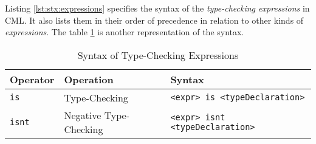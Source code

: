 Listing \ref{lst:stx:expressions} specifies the syntax of
the \emph{type-checking expressions} in CML.
It also lists them in their order of precedence
in relation to other kinds of \emph{expressions}.
The table \ref{tab:type-checking-syntax} is another representation of the syntax.

\begin{table}[H]
\centering
\begin{tabular}
{ l l l }
\hline
Operator & Operation & Syntax \\
\hline
\verb|is| & Type-Checking & \verb|<expr> is <typeDeclaration> | \\
\verb|isnt| & Negative Type-Checking & \verb|<expr> isnt <typeDeclaration>| \\
\end{tabular}
\caption{Syntax of Type-Checking Expressions}
\label{tab:type-checking-syntax}
\end{table}
